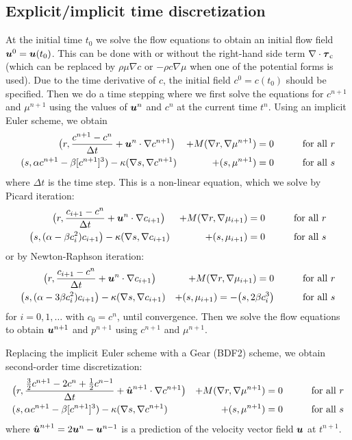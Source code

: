 \subsection{Explicit/implicit time discretization 
	\label{sec:di_expl}}
At the initial time $t_0$ we solve the flow equations to obtain an initial flow 
field $\boldsymbol{u}^0=\boldsymbol{u}(t_0)$. This can be done with or without
the right-hand side term $\nabla \cdot \boldsymbol{\tau}_\text{c}$ (which can be 
replaced by $\rho\mu\nabla c$ or $-\rho c\nabla \mu$ when one of the potential 
forms is used). Due to the time derivative of $c$, the initial field 
$c^0=c(t_0)$ should be specified.
Then we do a time
stepping where we first solve the equations for 
$c^{n+1}$ and $\mu^{n+1}$ using the values of $\boldsymbol{u}^n$ and $c^n$ at the
current time $t^n$. Using an implicit Euler scheme, we obtain
\begin{alignat*}{3}
&\big(r,\frac{c^{n+1}-c^n}{\Delta t}+\boldsymbol{u}^n\cdot\nabla c^{n+1}\big)&
+M(\nabla r,\nabla \mu^{n+1})=0 &&\qquad&\text{for all } r\\
(s,\alpha c^{n+1}&-\beta [c^{n+1}]^3)-\kappa(\nabla s,\nabla c^{n+1})   
&+(s,\mu^{n+1})=0 &&\qquad&\text{for all } s 
\end{alignat*}
where $\Delta t$ is the time step. This is a non-linear equation, which we
solve by Picard iteration:
\begin{alignat}{3}
&\big(r,\frac{c_{i+1}-c^n}{\Delta t}+\boldsymbol{u}^n\cdot\nabla   
c_{i+1}\big)&+M(\nabla r,\nabla \mu_{i+1})=0 &&\qquad&\text{for all } r\\
\big(s,(\alpha &-\beta c_{i}^2)c_{i+1}\big)-\kappa(\nabla s,\nabla c_{i+1}) 
&+(s,\mu_{i+1})=0 &&\qquad&\text{for all } s \label{eq:di_picard}
\end{alignat}
or by Newton-Raphson iteration:
\begin{alignat}{3}
&\big(r,\frac{c_{i+1}-c^n}{\Delta t}+\boldsymbol{u}^n\cdot\nabla c_{i+1}\big)&+ 
M(\nabla r,\nabla \mu_{i+1})=0 &&\qquad&\text{for all } r\\
\big(s,(\alpha &-3\beta c_{i}^2)c_{i+1}\big)-\kappa(\nabla s,\nabla c_{i+1})
&+(s,\mu_{i+1})= -\big(s,2\beta c_{i}^3 \big) &&\qquad&\text{for all } s
\label{eq:di_newton}
\end{alignat}
for $i=0,1,\ldots$ with $c_0=c^n$, until convergence.
Then we solve the flow equations to obtain $\boldsymbol{u}^{n+1}$ and $p^{n+1}$ using
$c^{n+1}$ and $\mu^{n+1}$.

Replacing the implicit Euler scheme with a Gear (BDF2) scheme,
we obtain second-order time discretization:
\begin{alignat*}{3}
&\big(r,\frac{\frac32c^{n+1}-2c^n+\frac12c^{n-1}}{\Delta t}+
\hat{\boldsymbol{u}}^{n+1}\cdot\nabla c^{n+1}\big)&+M(\nabla r,\nabla \mu^{n+1})
=0 &&\qquad&\text{for all } r\\
&(s, \alpha c^{n+1}-\beta [c^{n+1}]^3)-\kappa(\nabla s,\nabla c^{n+1})
&+(s,\mu^{n+1})=0 &&\qquad&\text{for all } s
\end{alignat*}
where $\hat{\boldsymbol{u}}^{n+1}=2\boldsymbol{u}^n-\boldsymbol{u}^{n-1}$ is a prediction of the
velocity vector field $\boldsymbol{u}$ at $t^{n+1}$.

